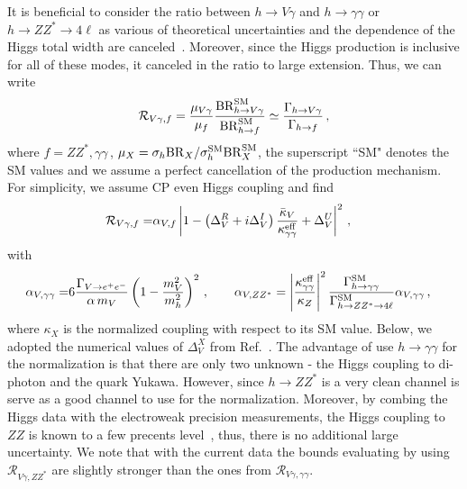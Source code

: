 \documentclass[../report.tex]{subfiles}
\newcommand{\cR}{\mathcal{R}}
\begin{document}
It is beneficial to consider the ratio between $h\to V\gamma$ and $h\to\gamma\gamma$ or $h\to ZZ^*\to4\ell$ as various of theoretical uncertainties and the dependence of the Higgs total width are canceled~\cite{Perez:2015aoa,Koenig:2015pha}. Moreover, since the Higgs production is inclusive for all of these modes, it canceled in the ratio to large extension. Thus, we can write 
% 
\begin{align}
	\cR_{V\gamma,f} 
=	\frac{\mu_{V\gamma} }{\mu_{f}}  \frac{ \BR^{\rm SM}_{h\to V\gamma}}{ \BR^{\rm SM}_{h\to f}}  
	\simeq  
	\frac{\Gamma_{h\to V\gamma}}{ \Gamma_{h\to f}}  \, ,
\end{align}
%
where $f=ZZ^*, \gamma\gamma\,$, $\mu_X = \sigma_h {\rm BR}_{X}/\sigma^{\rm SM}_h {\rm BR}^{\rm SM}_{X}$, the superscript ``SM" denotes the SM values and we assume a perfect cancellation of the production mechanism. 
For simplicity, we assume CP even Higgs coupling and find 
%
\begin{align}
	\cR_{V\gamma,f} 
=& 	\alpha_{V,f} \abs{1 - \left(\Delta^R_V+ i \Delta^I_V \right)\frac{\bar{\kappa}_V}{\kappa^{\rm eff}_{\gamma\gamma}} + \Delta^U_V}^2  \, , 	
\end{align}
%
with
%
\begin{align}	
	\alpha_{V,\gamma\gamma}
=&	6\frac{\Gamma_{V\to e^+e^-}}{\alpha \, m_V} \left( 1 - \frac{m^2_V}{m^2_h} \right)^2 \, , \quad\quad
%
	\alpha_{V,ZZ^*}
= \abs{\frac{\kappa^{\rm eff}_{\gamma\gamma}}{\kappa_{Z}}}^2  \frac{\Gamma^{\rm SM}_{h\to\gamma\gamma}}{\Gamma^{\rm SM}_{h\to ZZ^*\to 4\ell}}\alpha_{V,\gamma\gamma} \, ,
\end{align}
%
where $\kappa_X$ is the normalized coupling with respect to its SM value. Below, we adopted the numerical values of $\Delta^X_V$ from Ref.~\cite{Koenig:2015pha}.
The advantage of use $h\to\gamma\gamma$ for the normalization is that there are only two unknown - the Higgs coupling to di-photon and the quark Yukawa. 
However, since $h\to ZZ^*$ is a very clean channel is serve as a good channel to use for the normalization. 
Moreover, by combing the Higgs data with the electroweak precision measurements, the Higgs coupling to $ZZ$ is known to a few precents level~\cite{Falkowski:2013dza,deBlas:2016ojx}, thus, there is no additional large uncertainty.  
We note that with the current data the bounds evaluating by using $\cR_{V\gamma,ZZ^*}$ are slightly stronger than the ones from $\cR_{V\gamma,\gamma\gamma}$. 
\end{document}
